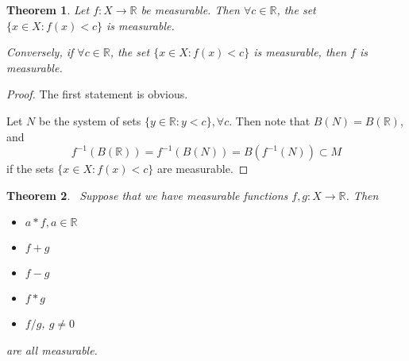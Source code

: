 \documentclass[11pt,a4paper]{report}
\theoremstyle{plain}
\newtheorem{thm}{Theorem}[section]
\theoremstyle{definition}
\theoremstyle{remark}
\newcommand{\R}{\mathbb{R}}
\begin{document}
\begin{thm}
  Let $f: X \rightarrow \R$ be measurable. Then $\forall c \in \R$, the set $\{ x \in X : f(x) < c \}$ is measurable. 
    
  Conversely, if $\forall c \in \R$, the set $\{ x \in X : f(x) < c \}$ is measurable, then $f$ is measurable.
\end{thm}

\begin{proof}
    The first statement is obvious.

    Let $N$ be the system of sets $\{ y \in \R  : y < c \}, \forall c$. Then note that $B(N) = B(\R)$, and
    $$ f^{-1}(B(\R)) = f^{-1}(B(N)) = B(f^{-1}(N)) \subset M $$
    if the sets $\{ x \in X : f(x) < c \}$ are measurable.
\end{proof}

\begin{thm}\;\
  Suppose that we have measurable functions $f, g: X \rightarrow \R$. Then
  \begin{itemize}
    \item $a * f, a \in \R$
    \item $f + g$
    \item $f - g$
    \item $f * g$
    \item $f / g$, $g \ne 0$
  \end{itemize}
  are all measurable.
\end{thm}
\end{document}
